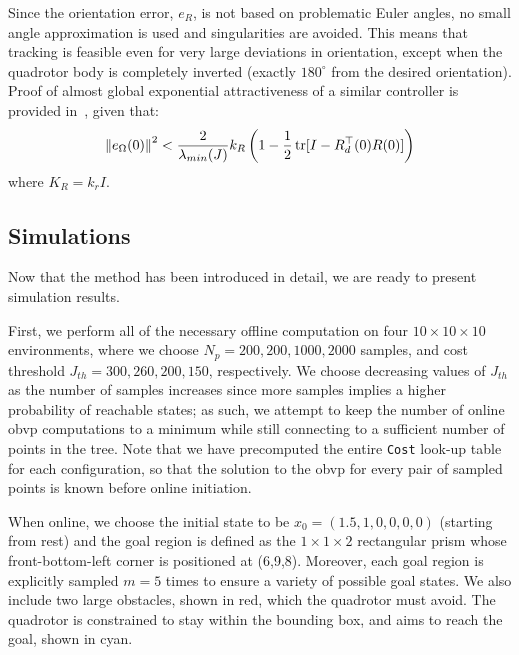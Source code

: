 Since the orientation error, $e_R$, is not based on problematic Euler angles, no small angle approximation is used and singularities are avoided. This means that tracking is feasible even for very large deviations in orientation, except when the quadrotor body is completely inverted (exactly $180^\circ$ from the desired orientation). Proof of almost global exponential attractiveness of a similar controller is provided in~\cite{Lee2010}, given that:
\begin{equation}
    \left\lVert e_\Omega (0)\right\rVert^2 < \frac{2}{\lambda_{min}(J)}k_R \left( 1 - \frac{1}{2}\operatorname{tr}[I - R_d^\top(0)R(0)] \right)
\end{equation}
where $K_R = k_r I$.





\subsection{Simulations}


Now that the method has been introduced in detail, we are ready to present simulation results.

First, we perform all of the necessary offline computation on four $10 \times 10 \times 10$ environments, where we choose $N_p = 200, 200, 1000, 2000$ samples, and cost threshold $J_{th} = 300, 260, 200, 150$, respectively. We choose decreasing values of $J_{th}$ as the number of samples increases since more samples implies a higher probability of reachable states; as such, we attempt to keep the number of online \gls{obvp} computations to a minimum while still connecting to a sufficient number of points in the tree. Note that we have precomputed the entire \texttt{Cost} look-up table for each configuration, so that the solution to the \gls{obvp} for every pair of sampled points is known before online initiation.

When online, we choose the initial state to be $x_0 = (1.5, 1, 0, 0, 0, 0)$ (starting from rest) and the goal region is defined as the $1 \times 1 \times 2$ rectangular prism whose front-bottom-left corner is positioned at (6,9,8). Moreover, each goal region is explicitly sampled $m = 5$ times to ensure a variety of possible goal states. We also include two large obstacles, shown in red, which the quadrotor must avoid. The quadrotor is constrained to stay within the bounding box, and aims to reach the goal, shown in cyan.

